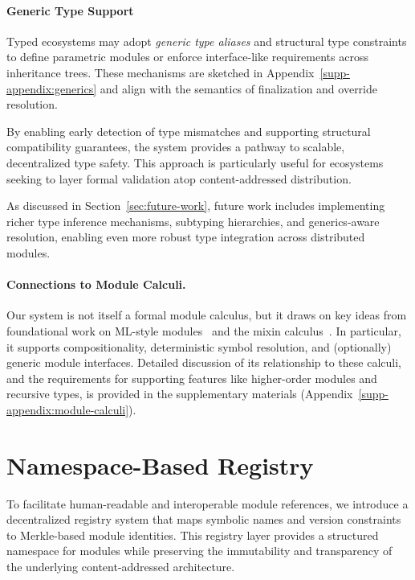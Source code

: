 \documentclass[sigplan,screen]{acmart}
\begin{document}
\paragraph{Generic Type Support}
Typed ecosystems may adopt \emph{generic type aliases} and structural type constraints to define parametric modules or enforce interface-like requirements across inheritance trees. These mechanisms are sketched in Appendix~\ref{supp-appendix:generics} and align with the semantics of finalization and override resolution.

By enabling early detection of type mismatches and supporting structural compatibility guarantees, the system provides a pathway to scalable, decentralized type safety. This approach is particularly useful for ecosystems seeking to layer formal validation atop content-addressed distribution.

As discussed in Section~\ref{sec:future-work}, future work includes implementing richer type inference mechanisms, subtyping hierarchies, and generics-aware resolution, enabling even more robust type integration across distributed modules.

\paragraph{Connections to Module Calculi.}
Our system is not itself a formal module calculus, but it draws on key ideas from foundational work on ML-style modules~\cite{ml_modules} and the mixin calculus~\cite{mixin_calculus}. In particular, it supports compositionality, deterministic symbol resolution, and (optionally) generic module interfaces. Detailed discussion of its relationship to these calculi, and the requirements for supporting features like higher-order modules and recursive types, is provided in the supplementary materials (Appendix~\ref{supp-appendix:module-calculi}).

\section{Namespace-Based Registry}
\label{sec:namespace-based-registry}

To facilitate human-readable and interoperable module references, we introduce a decentralized registry system that maps symbolic names and version constraints to Merkle-based module identities. This registry layer provides a structured namespace for modules while preserving the immutability and transparency of the underlying content-addressed architecture.
\end{document}
